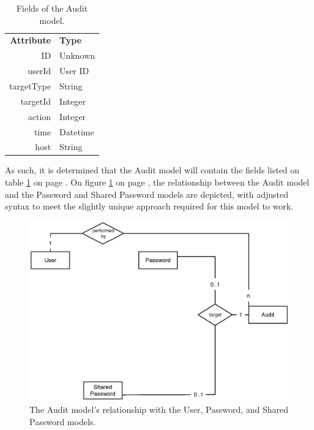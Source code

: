 			\begin{table}[p]
				\centering
				\begin{tabular}{r|l}
					\textbf{Attribute} 		& \textbf{Type} 		\\
					ID 						& Unknown 	\\
					userId 					& User ID 	\\
					targetType 				& String 	\\
					targetId				& Integer 	\\
					action					& Integer 	\\
					time  					& Datetime 	\\
					host  					& String 	\\
				\end{tabular}
				\caption{Fields of the Audit model.}
				\label{fig:model:audit}
			\end{table}

			As such, it is determined that the Audit model will contain the fields listed on table \ref{fig:model:audit} on page \pageref{fig:model:audit}. On figure \ref{fig:relationship:audit-user} on page \pageref{fig:relationship:audit-user}, the relationship between the Audit model and the Password and Shared Password models are depicted, with adjusted syntax to meet the slightly unique approach required for this model to work.
			
			\begin{figure}[p]
				\centering
				\includegraphics[width=\textwidth]{figures/design/uml/erd/audit-user-password-sharedpassword.eps}
				\caption{The Audit model's relationship with the User, Password, and Shared Password models.}
				\label{fig:relationship:audit-user}
			\end{figure}

